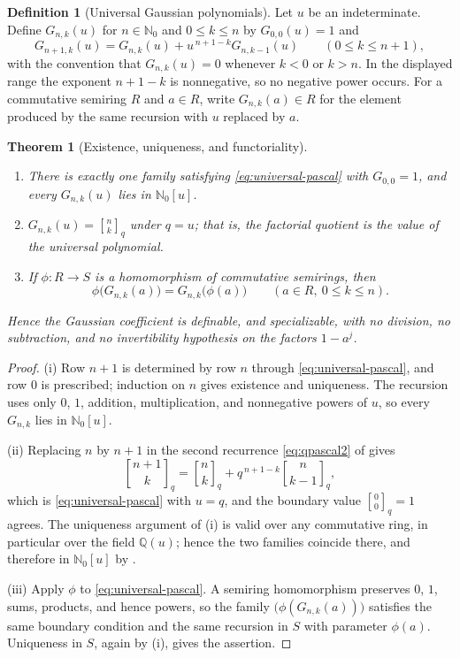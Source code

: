 \documentclass[11pt,oneside,openany]{book}
\newtheorem{theorem}{Theorem}[chapter]
\theoremstyle{definition}
\newtheorem{definition}[definition]{Definition}
\theoremstyle{remark}
\newcommand{\qbinom}[2]{\genfrac{[}{]}{0pt}{}{#1}{#2}_{q}}
\newcommand{\Q}{\mathbb Q}
\newcommand{\N}{\mathbb N}
\begin{document}
\begin{definition}[Universal Gaussian polynomials]\label{def:universal-gaussian}
Let $u$ be an indeterminate.  Define $G_{n,k}(u)$ for $n\in\N_0$ and $0\le k\le n$ by
$G_{0,0}(u)=1$ and
\begin{equation}\label{eq:universal-pascal}
 G_{n+1,k}(u)=G_{n,k}(u)+u^{\,n+1-k}G_{n,k-1}(u)
 \qquad(0\le k\le n+1),
\end{equation}
with the convention that $G_{n,k}(u)=0$ whenever $k<0$ or $k>n$.  In the displayed range the exponent $n+1-k$ is nonnegative, so no negative power occurs.  For a commutative semiring $R$ and $a\in R$, write $G_{n,k}(a)\in R$ for the element produced by the same recursion with $u$ replaced by $a$.
\end{definition}

\begin{theorem}[Existence, uniqueness, and functoriality]\label{thm:universal-functoriality}
\sloppy
\begin{enumerate}[label=\textup{(\roman*)}]
\item There is exactly one family satisfying \eqref{eq:universal-pascal}
 with $G_{0,0}=1$, and every $G_{n,k}(u)$ lies in $\N_0[u]$.
\item $G_{n,k}(u)=\qbinom nk$ under $q=u$; that is, the factorial
 quotient is the value of the universal polynomial.
\item If $\phi\colon R\to S$ is a homomorphism of commutative semirings, then
\[
 \phi\bigl(G_{n,k}(a)\bigr)=G_{n,k}\bigl(\phi(a)\bigr)
 \qquad(a\in R,\ 0\le k\le n).
\]
\end{enumerate}
Hence the Gaussian coefficient is definable, and specializable, with no division, no subtraction, and no invertibility hypothesis on the factors $1-a^j$.
\end{theorem}

\begin{proof}
(i)  Row $n+1$ is determined by row $n$ through \eqref{eq:universal-pascal}, and row $0$ is prescribed; induction on $n$ gives existence and uniqueness.  The recursion uses only $0$, $1$, addition, multiplication, and nonnegative powers of $u$, so every $G_{n,k}$ lies in $\N_0[u]$.

(ii)  Replacing $n$ by $n+1$ in the second recurrence \eqref{eq:qpascal2} of  gives
\[
 \qbinom{n+1}{k}=\qbinom nk+q^{\,n+1-k}\qbinom n{k-1},
\]
which is \eqref{eq:universal-pascal} with $u=q$, and the boundary value $\qbinom00=1$ agrees.  The uniqueness argument of (i) is valid over any commutative ring, in particular over the field $\Q(u)$; hence the two families coincide there, and therefore in $\N_0[u]$ by .

(iii)  Apply $\phi$ to \eqref{eq:universal-pascal}.  A semiring homomorphism preserves $0$, $1$, sums, products, and hence powers, so the family $\bigl(\phi(G_{n,k}(a))\bigr)$ satisfies the same boundary condition and the same recursion in $S$ with parameter $\phi(a)$.  Uniqueness in $S$, again by (i), gives the assertion.
\end{proof}
\end{document}

